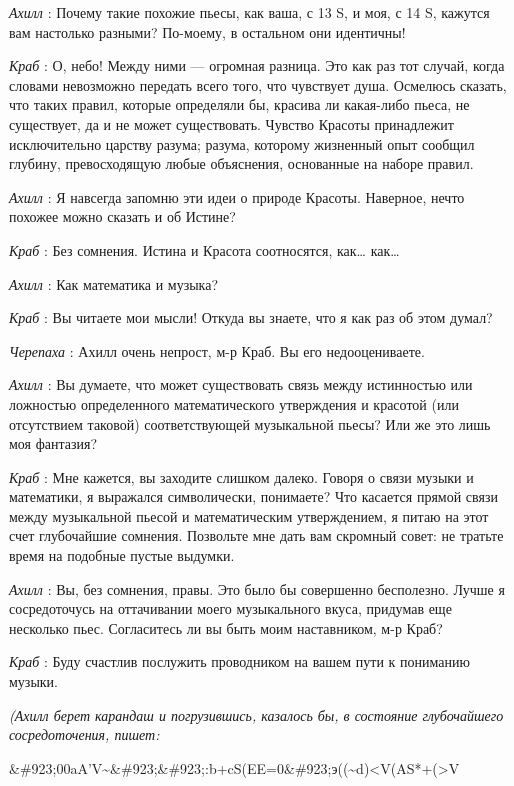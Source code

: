 \documentclass[../main.tex]{subfiles}
\begin{document}
\begin{dialogue}
\emph{Ахилл} : Почему такие похожие пьесы, как ваша, с 13 S, и моя, с 14 S, кажутся вам настолько разными? По-моему, в остальном они идентичны!

\emph{Краб} : О, небо! Между ними --- огромная разница. Это как раз тот случай, когда словами невозможно передать всего того, что чувствует душа. Осмелюсь сказать, что таких правил, которые определяли бы, красива ли какая-либо пьеса, не существует, да и не может существовать. Чувство Красоты принадлежит исключительно царству разума; разума, которому жизненный опыт сообщил глубину, превосходящую любые объяснения, основанные на наборе правил.

\emph{Ахилл} : Я навсегда запомню эти идеи о природе Красоты. Наверное, нечто похожее можно сказать и об Истине?

\emph{Краб} : Без сомнения. Истина и Красота соотносятся, как\ldots{} как\ldots{}

\emph{Ахилл} : Как математика и музыка?

\emph{Краб} : Вы читаете мои мысли! Откуда вы знаете, что я как раз об этом думал?

\emph{Черепаха} : Ахилл очень непрост, м-р Краб. Вы его недооцениваете.

\emph{Ахилл} : Вы думаете, что может существовать связь между истинностью или ложностью определенного математического утверждения и красотой (или отсутствием таковой) соответствующей музыкальной пьесы? Или же это лишь моя фантазия?

\emph{Краб} : Мне кажется, вы заходите слишком далеко. Говоря о связи музыки и математики, я выражался символически, понимаете? Что касается прямой связи между музыкальной пьесой и математическим утверждением, я питаю на этот счет глубочайшие сомнения. Позвольте мне дать вам скромный совет: не тратьте время на подобные пустые выдумки.

\emph{Ахилл} : Вы, без сомнения, правы. Это было бы совершенно бесполезно. Лучше я сосредоточусь на оттачивании моего музыкального вкуса, придумав еще несколько пьес. Согласитесь ли вы быть моим наставником, м-р Краб?

\emph{Краб} : Буду счастлив послужить проводником на вашем пути к пониманию музыки.

\emph{(Ахилл берет карандаш и погрузившись, казалось бы, в состояние глубочайшего сосредоточения, пишет:}

\&\#923;00aA'V\textasciitilde\&\#923;\&\#923;:b+cS(EE=0\&\#923;э((\textasciitilde d)\textless V(AS*+(\textgreater V


\end{dialogue}
\end{document}
